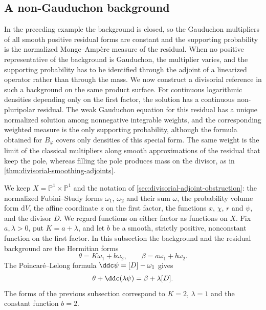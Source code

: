 \subsection{A non-Gauduchon background}
\label{sec:nongauduchon-weak-adjoints}

In the preceding example the background is closed, so the Gauduchon multipliers of all smooth positive residual forms are constant and the supporting probability is the normalized Monge--Amp\`ere measure of the residual. When no positive representative of the background is Gauduchon, the multiplier varies, and the supporting probability has to be identified through the adjoint of a linearized operator rather than through the mass. We now construct a divisorial reference in such a background on the same product surface. For continuous logarithmic densities depending only on the first factor, the solution has a continuous non-pluripolar residual. The weak Gauduchon equation for this residual has a unique normalized solution among nonnegative integrable weights, and the corresponding weighted measure is the only supporting probability, although the formula obtained for $B_\varphi$ covers only densities of this special form. The same weight is the limit of the classical multipliers along smooth approximations of the residual that keep the pole, whereas filling the pole produces mass on the divisor, as in \cref{thm:divisorial-smoothing-adjoints}.

We keep $X=\mathbb P^1\times\mathbb P^1$ and the notation of \cref{sec:divisorial-adjoint-obstruction}: the normalized Fubini--Study forms $\omega_1$, $\omega_2$ and their sum $\omega$, the probability volume form $\mathrm dV$, the affine coordinate $z$ on the first factor, the functions $x$, $\chi$, $r$ and $\psi$, and the divisor $D$. We regard functions on either factor as functions on $X$. Fix $a,\lambda>0$, put $K=a+\lambda$, and let $b$ be a smooth, strictly positive, nonconstant function on the first factor. In this subsection the background and the residual background are the Hermitian forms
\[
 \theta=K\omega_1+b\omega_2,\qquad\beta=a\omega_1+b\omega_2.
\]
The Poincar\'e--Lelong formula $\ddc\psi=[D]-\omega_1$ gives
\begin{equation}\label{eq:nongauduchon-pole}
 \theta+\ddc(\lambda\psi)=\beta+\lambda[D].
\end{equation}
The forms of the previous subsection correspond to $K=2$, $\lambda=1$ and the constant function $b=2$.

